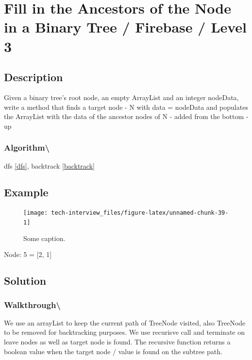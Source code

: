 \documentclass[]{book}
\begin{document}
\hypertarget{fill-in-the-ancestors-of-the-node-in-a-binary-tree-firebase-level-3}{%
\section{Fill in the Ancestors of the Node in a Binary Tree / Firebase / Level 3}\label{fill-in-the-ancestors-of-the-node-in-a-binary-tree-firebase-level-3}}

\hypertarget{description-75}{%
\subsection{Description}\label{description-75}}

Given a binary tree's root node, an empty ArrayList and an integer nodeData, write a method that finds a target
node - N with data = nodeData and populates the ArrayList with the data of the ancestor nodes of N - added from the
bottom - up

\hypertarget{algorithm-94}{%
\subsubsection{Algorithm\textbackslash{}}\label{algorithm-94}}

dfs \ref{dfs}, backtrack \ref{backtrack}

\hypertarget{example-72}{%
\subsection{Example}\label{example-72}}

\begin{figure}
\texttt{[image: tech-interview\_files/figure-latex/unnamed-chunk-39-1]} \caption{Some caption.}\label{fig:unnamed-chunk-39}
\end{figure}

Node: 5 = {[}2, 1{]}

\hypertarget{solution-52}{%
\subsection{Solution}\label{solution-52}}

\hypertarget{walkthrough-86}{%
\subsubsection{Walkthrough\textbackslash{}}\label{walkthrough-86}}

We use an arrayList to keep the current path of TreeNode visited, also TreeNode to be removed for backtracking purposes.
We use recurisve call and terminate on leave nodes as well as target node is found. The recursive function returns a
boolean value when the target node / value is found on the subtree path.
\end{document}
